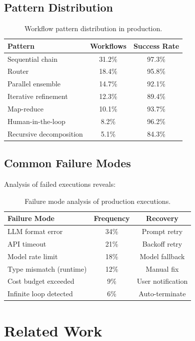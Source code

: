 \documentclass[11pt,twocolumn]{article}
\begin{document}
\subsection{Pattern Distribution}

\begin{table}[H]
\centering
\small
\begin{tabular}{lcc}
\toprule
\textbf{Pattern} & \textbf{Workflows} & \textbf{Success Rate} \\
\midrule
Sequential chain & 31.2\% & 97.3\% \\
Router & 18.4\% & 95.8\% \\
Parallel ensemble & 14.7\% & 92.1\% \\
Iterative refinement & 12.3\% & 89.4\% \\
Map-reduce & 10.1\% & 93.7\% \\
Human-in-the-loop & 8.2\% & 96.2\% \\
Recursive decomposition & 5.1\% & 84.3\% \\
\bottomrule
\end{tabular}
\caption{Workflow pattern distribution in production.}
\label{tab:patterns}
\end{table}

\subsection{Common Failure Modes}

Analysis of failed executions reveals:

\begin{table}[H]
\centering
\small
\begin{tabular}{lcc}
\toprule
\textbf{Failure Mode} & \textbf{Frequency} & \textbf{Recovery} \\
\midrule
LLM format error & 34\% & Prompt retry \\
API timeout & 21\% & Backoff retry \\
Model rate limit & 18\% & Model fallback \\
Type mismatch (runtime) & 12\% & Manual fix \\
Cost budget exceeded & 9\% & User notification \\
Infinite loop detected & 6\% & Auto-terminate \\
\bottomrule
\end{tabular}
\caption{Failure mode analysis of production executions.}
\label{tab:failures}
\end{table}

\section{Related Work}
\label{sec:related}
\end{document}
